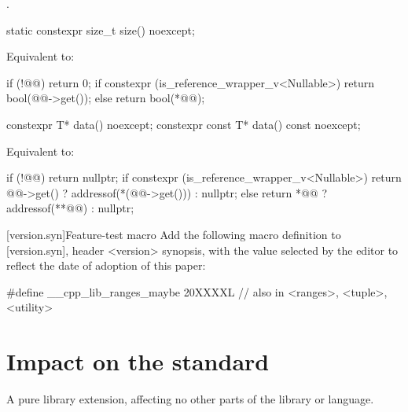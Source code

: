 \documentclass[a4paper,10pt,oneside,openany,final,article]{memoir}
\begin{document}
\begin{wording}
\begin{itemdescr}
  \pnum{}
  \returns
  .
\end{itemdescr}

\begin{itemdecl}
  static constexpr size_t size() noexcept;
\end{itemdecl}

\begin{itemdescr}
  \pnum{}
  \effects{}
  Equivalent to:

  \begin{codeblock}
    if (!@@)
      return 0;
    if constexpr (is_reference_wrapper_v<Nullable>) {
      return bool(@@->get());
    } else {
      return bool(*@@);
    }
  \end{codeblock}
\end{itemdescr}

\begin{itemdecl}
  constexpr T* data() noexcept;
  constexpr const T* data() const noexcept;
\end{itemdecl}

\begin{itemdescr}
\pnum{}
\effects{}
Equivalent to:
\begin{codeblock}
  if (!@@)
    return nullptr;
  if constexpr (is_reference_wrapper_v<Nullable>) {
    return @@->get() ? addressof(*(@@->get())) : nullptr;
  } else {
    return *@@ ? addressof(**@@) : nullptr;
  }
\end{codeblock}
\end{itemdescr}

[version.syn]{Feature-test macro}
Add the following macro definition to [version.syn], header <version> synopsis, with the value selected by the editor to reflect the date of adoption of this paper:

\begin{codeblock}
  #define __cpp_lib_ranges_maybe 20XXXXL // also in <ranges>, <tuple>, <utility>
\end{codeblock}

\end{wording}

\chapter{Impact on the standard}

A pure library extension, affecting no other parts of the library or language.
\end{document}
